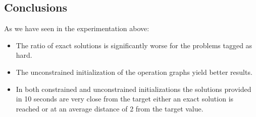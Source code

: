 \documentclass[a4paper,10pt,titlepage]{article}
\begin{document}
\subsection{Conclusions}

\par As we have seen in the experimentation above:
\begin{itemize}
	\item The ratio of exact solutions is significantly worse for the problems tagged as hard.
	\item The unconstrained initialization of the operation graphs yield  better results.
	\item In both constrained and unconstrained initializations the solutions provided in 10 seconds are very close from the target either an exact solution is reached or at an average distance of 2 from the target value.
\end{itemize} 
\end{document}
